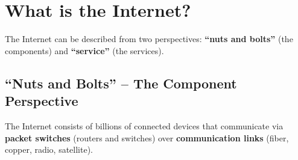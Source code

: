 \section{What is the Internet?}

The Internet can be described from two perspectives: \textbf{``nuts and bolts''} (the components) and \textbf{``service''} (the services).

\subsection{``Nuts and Bolts'' -- The Component Perspective}

\begin{keybox}
The Internet consists of billions of connected devices that communicate via \textbf{packet switches} (routers and switches) over \textbf{communication links} (fiber, copper, radio, satellite).
\end{keybox}

